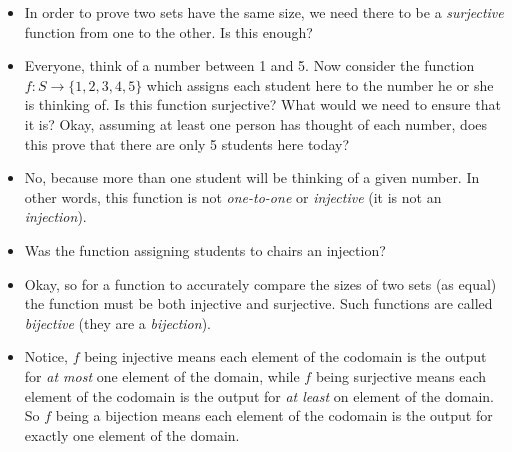 \documentclass[12pt]{article}
\theoremstyle{plain}
\theoremstyle{definition}
\theoremstyle{remark}
\begin{document}
\begin{itemize}
\item In order to prove two sets have the same size, we need there to be a {\em surjective} function from one to the other.  Is this enough?

\item Everyone, think of a number between 1 and 5.  Now consider the function $f:S \to \{1,2,3,4,5\}$ which assigns each student here to the number he or she is thinking of.  Is this function surjective?  What would we need to ensure that it is?  Okay, assuming at least one person has thought of each number, does this prove that there are only 5 students here today?

\item No, because more than one student will be thinking of a given number.  In other words, this function is not {\em one-to-one} or {\em injective} (it is not an {\em injection}).

\item Was the function assigning students to chairs an injection?


\item Okay, so for a function to accurately compare the sizes of two sets (as equal) the function must be both injective and surjective.  Such functions are called {\em bijective} (they are a {\em bijection}).

\item Notice, $f$ being injective means each element of the codomain is the output for {\em at most} one element of the domain, while $f$ being surjective means each element of the codomain is the output for {\em at least} on element of the domain.  So $f$ being a bijection means each element of the codomain is the output for exactly one element of the domain.


\end{itemize}
\end{document}
